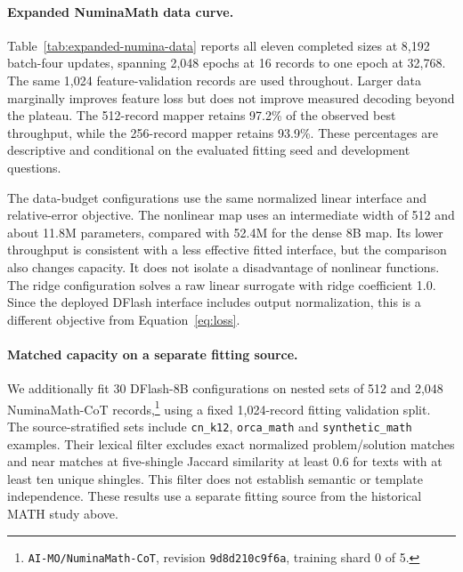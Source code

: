 \documentclass{article}
\begin{document}
\paragraph{Expanded NuminaMath data curve.}
Table~\ref{tab:expanded-numina-data} reports all eleven completed sizes
at 8,192 batch-four updates, spanning 2,048 epochs at 16 records to one
epoch at 32,768. The same 1,024 feature-validation records are used
throughout. Larger data marginally improves feature loss but does not
improve measured decoding beyond the plateau. The 512-record mapper
retains 97.2\% of the observed best throughput, while the 256-record
mapper retains 93.9\%. These percentages are descriptive and conditional
on the evaluated fitting seed and development questions.

\begin{table}[H]
\centering\small
\caption{NuminaMath fitting at fixed 8,192 updates on 128 paired MATH
questions with a 2,048-token output cap. All eleven mapper outputs
score 105/128, versus AR's 104/128.}
\label{tab:expanded-numina-data}

\end{table}



\begin{table}[H]
\caption{Completed DFlash-8B fitting studies on the same 128-question
set. Records count distinct fitting examples. Two passes over 4,096
records give 8,192 presentations. Source reuse is paired within each run.}
\label{tab:fit-ablation}
\centering\small
\setlength{\tabcolsep}{3.5pt}

\end{table}

The data-budget configurations use the same normalized linear interface
and relative-error objective. The nonlinear map uses an intermediate
width of 512 and about 11.8M parameters, compared with 52.4M for the dense
8B map. Its lower throughput is consistent with a less effective fitted
interface, but the comparison also changes capacity. It does not isolate
a disadvantage of nonlinear functions. The ridge configuration solves a
raw linear surrogate with ridge coefficient 1.0. Since the deployed DFlash
interface includes output normalization, this is a different objective
from Equation~\ref{eq:loss}.

\paragraph{Matched capacity on a separate fitting source.}
We additionally fit 30 DFlash-8B configurations on nested sets of 512
and 2,048 NuminaMath-CoT records,\footnote{\texttt{AI-MO/NuminaMath-CoT}, revision \texttt{9d8d210c9f6a}, training shard 0 of 5.} using a fixed 1,024-record fitting
validation split. The source-stratified sets include \texttt{cn\_k12},
\texttt{orca\_math} and \texttt{synthetic\_math} examples. Their lexical
filter excludes exact normalized problem/solution matches and near
matches at five-shingle Jaccard similarity at least 0.6 for texts with
at least ten unique shingles. This filter does not
establish semantic or template independence. These results use a separate
fitting source from the historical MATH study above.
\end{document}
